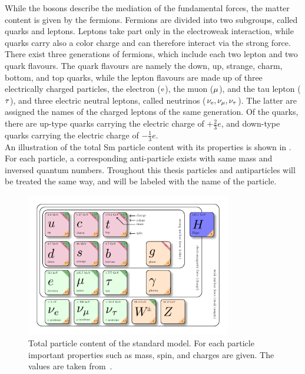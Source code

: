 While the bosons describe the mediation of the fundamental forces, the matter content is given by the fermions. Fermions are divided into two subgroups, called quarks and leptons. Leptons take part only in the electroweak interaction, while quarks carry also a color charge and can therefore interact via the strong force. There exist three generations of fermions, which include each two lepton and two quark flavours. The quark flavours are namely the down, up, strange, charm, bottom, and top quarks, while the lepton flavours are made up of three electrically charged particles, the electron ($\mathrm{e}$), the muon ($\mu$), and the tau lepton ($\tau$), and three electric neutral leptons, called neutrinos ($\nu_\mathrm{{e}},\nu_{\mu},\nu_{\tau}$). The latter are assigned the names of the charged leptons of the same generation. Of the quarks, there are up-type quarks carrying the electric charge of $+\frac{2}{3}e$, and down-type quarks carrying the electric charge of $-\frac{1}{3}e$.\\
An illustration of the total Sm particle content with its properties is shown in .
For each particle, a corresponding anti-particle exists with same mass and inversed quantum numbers. Troughout this thesis particles and antiparticles will be treated the same way, and will be labeled with the name of the particle.\\

\begin{figure}[!htpb]
\centering
  \includegraphics[width=0.8\textwidth]{figures/general/SM}
  \caption{Total particle content of the standard model. For each particle important properties such as mass, spin, and charges are given. The values are taken from~\cite{PDG}.}
  \label{fig:SM}

\end{figure}


